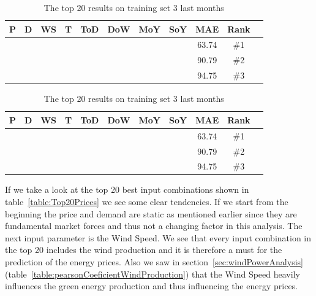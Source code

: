 \begin{table}[H]
\centering  %
\begin{tabular}{c c c c c c c c c c c} %
P & D & WS & T & ToD & DoW & MoY & SoY & MAE & Rank\\ [0.5ex] %
\hline
\x    & \x    & \x    & \x    & \x\m  & \x\m  & \x\m  &       & 63.74 & \#1 \\
\x    & \x    & \x    & \x    & \x\m  & \x\m  &       &       & 90.79 & \#2 \\
\x    & \x    & \x    & \x    & \x\m  & \x\m  &       & \x\m  & 94.75 & \#3 \\
\hline
\end{tabular}
\caption{The top 20 results on training set 3 last months} %
\label{table:1YearTrain} %
\end{table}

\begin{table}[H]
\centering  %
\begin{tabular}{c c c c c c c c c c c} %
P & D & WS & T & ToD & DoW & MoY & SoY & MAE & Rank\\ [0.5ex] %
\hline
\x    & \x    & \x    & \x    & \x\m  & \x\m  & \x\m  &       & 63.74 & \#1 \\
\x    & \x    & \x    & \x    & \x\m  & \x\m  &       &       & 90.79 & \#2 \\
\x    & \x    & \x    & \x    & \x\m  & \x\m  &       & \x\m  & 94.75 & \#3 \\
\hline
\end{tabular}
\caption{The top 20 results on training set 3 last months} %
\label{table:1YearTrain} %
\end{table}

If we take a look at the top 20 best input combinations shown in table~\ref{table:Top20Prices} we see some clear tendencies. If we start from the beginning the price and demand are static as mentioned earlier since they are fundamental market forces and thus not a changing factor in this analysis. The next input parameter is the Wind Speed. We see that every input combination in the top 20 includes the wind production and it is therefore a must for the prediction of the energy prices. Also we saw in section~\ref{sec:windPowerAnalysis}(table~\ref{table:pearsonCoeficientWindProduction}) that the Wind Speed heavily influences the green energy production and thus influencing the energy prices. 

